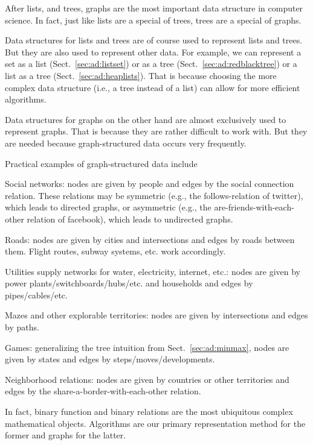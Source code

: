 After lists, and trees, graphs are the most important data structure in computer science.
In fact, just like lists are a special of trees, trees are a special of graphs.

Data structures for lists and trees are of course used to represent lists and trees.
But they are also used to represent other data.
For example, we can represent a set as a list (Sect.~\ref{sec:ad:listset}) or as a tree (Sect.~\ref{sec:ad:redblacktree}) or a list as a tree (Sect.~\ref{sec:ad:heaplists}).
That is because choosing the more complex data structure (i.e., a tree instead of a list) can allow for more efficient algorithms.

Data structures for graphs on the other hand are almost exclusively used to represent graphs.
That is because they are rather difficult to work with.
But they are needed because graph-structured data occurs very frequently.

Practical examples of graph-structured data include
\begin{compactitem}
 \item Social networks: nodes are given by people and edges by the social connection relation.
  These relations may be symmetric (e.g., the follows-relation of twitter), which leads to directed graphs, or asymmetric (e.g., the are-friends-with-each-other relation of facebook), which leads to undirected graphs.
 \item Roads: nodes are given by cities and intersections and edges by roads between them. Flight routes, subway systems, etc. work accordingly.
 \item Utilities supply networks for water, electricity, internet, etc.: nodes are given by power plants/switchboards/hubs/etc. and households and edges by pipes/cables/etc.
 \item Mazes and other explorable territories: nodes are given by intersections and edges by paths.
 \item Games: generalizing the tree intuition from Sect.~\ref{sec:ad:minmax}, nodes are given by states and edges by steps/moves/developments.
 \item Neighborhood relations: nodes are given by countries or other territories and edges by the share-a-border-with-each-other relation.
\end{compactitem}

In fact, binary function and binary relations are the most ubiquitous complex mathematical objects.
Algorithms are our primary representation method for the former and graphs for the latter.

